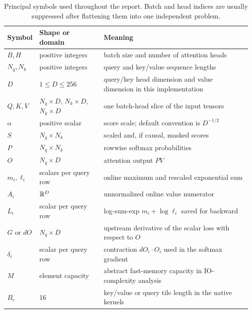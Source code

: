 \begin{table}[htbp]
\centering
\caption{Principal symbols used throughout the report. Batch and head indices are usually suppressed after flattening them into one independent problem.}
\label{tab:notation}
\begin{tabularx}{\textwidth}{@{}l l X@{}}
\toprule
Symbol & Shape or domain & Meaning \\
\midrule
$B,H$ & positive integers & batch size and number of attention heads \\
$N_q,N_k$ & positive integers & query and key/value sequence lengths \\
$D$ & $1\leq D\leq256$ & query/key head dimension and value dimension in this implementation \\
$Q,K,V$ & $N_q\!\times D$, $N_k\!\times D$, $N_k\!\times D$ & one batch-head slice of the input tensors \\
$\alpha$ & positive scalar & score scale; default convention is $D^{-1/2}$ \\
$S$ & $N_q\times N_k$ & scaled and, if causal, masked scores \\
$P$ & $N_q\times N_k$ & rowwise softmax probabilities \\
$O$ & $N_q\times D$ & attention output $PV$ \\
$m_i,\ell_i$ & scalars per query row & online maximum and rescaled exponential sum \\
$A_i$ & $\mathbb{R}^D$ & unnormalized online value numerator \\
$L_i$ & scalar per query row & log-sum-exp $m_i+\log\ell_i$ saved for backward \\
$G$ or $dO$ & $N_q\times D$ & upstream derivative of the scalar loss with respect to $O$ \\
$\delta_i$ & scalar per query row & contraction $dO_i\cdot O_i$ used in the softmax gradient \\
$M$ & element capacity & abstract fast-memory capacity in IO-complexity analysis \\
$B_c$ & 16 & key/value or query tile length in the native kernels \\
\bottomrule
\end{tabularx}
\end{table}
